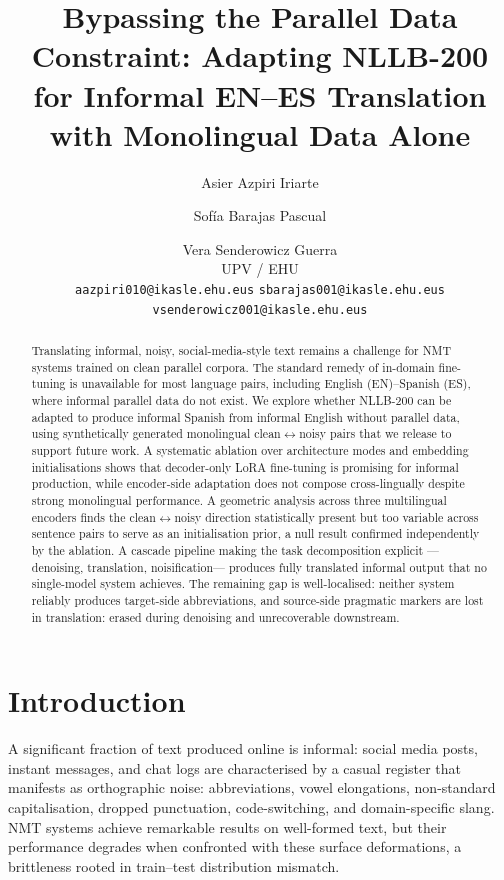 \documentclass[11pt]{article}
\title{Bypassing the Parallel Data Constraint: Adapting NLLB-200 for Informal EN--ES Translation with Monolingual Data Alone}
\author{Asier Azpiri Iriarte \and Sofía Barajas Pascual \and Vera Senderowicz Guerra \\
  UPV / EHU \\
  \texttt{aazpiri010@ikasle.ehu.eus} \quad \texttt{sbarajas001@ikasle.ehu.eus} \quad \texttt{vsenderowicz001@ikasle.ehu.eus}}
\begin{document}
\maketitle

\begin{abstract}
Translating informal, noisy, social-media-style text remains a challenge 
for NMT systems trained on clean parallel corpora. The standard remedy 
of in-domain fine-tuning is unavailable for most language pairs, including 
English (EN)--Spanish (ES), where informal parallel data do not exist. We explore whether NLLB-200 can be adapted to produce informal Spanish 
from informal English without parallel data, using synthetically 
generated monolingual clean$\leftrightarrow$noisy pairs that we release to support future work. A systematic ablation over architecture modes and 
embedding initialisations shows that decoder-only LoRA fine-tuning is 
promising for informal production, while encoder-side adaptation does not compose cross-lingually despite strong monolingual performance. A geometric analysis across three multilingual encoders finds the clean$\leftrightarrow$noisy direction 
statistically present but too variable across sentence pairs to serve as 
an initialisation prior, a null result confirmed independently by the 
ablation. A cascade pipeline making the task decomposition explicit 
---denoising, translation, noisification--- produces fully translated informal output that no single-model system achieves. The remaining gap is well-localised: neither system reliably produces target-side abbreviations, and source-side pragmatic markers  are lost in translation: erased during denoising and unrecoverable downstream.
\end{abstract}

\section{Introduction}

A significant fraction of text produced online is informal: social media posts,
instant messages, and chat logs are characterised by a casual register that
manifests as orthographic noise: abbreviations, vowel elongations, non-standard
capitalisation, dropped punctuation, code-switching, and domain-specific slang.
NMT systems achieve remarkable results on well-formed text, but their performance
degrades when confronted with these surface deformations, a brittleness rooted
in train--test distribution mismatch.
\end{document}
